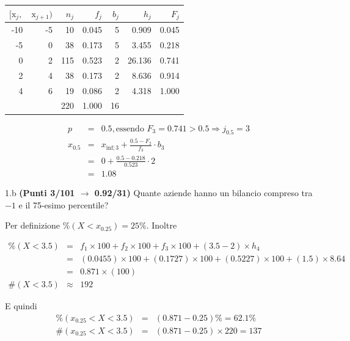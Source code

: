 \documentclass[
  11pt,
]{book}
\theoremstyle{mytheoremstyle}
\theoremstyle{mydefstyle}
\newenvironment{sol}
  {
  \begin{tcolorbox}[enhanced,breakable,arc=0.1mm,boxrule=1pt,colback=white,colframe=iblue,
  title=\bf \fontfamily{lmss}\selectfont \hspace{.5 cm} Soluzione,drop fuzzy shadow]

}{
\end{tcolorbox}
  }
\begin{document}
\begin{sol}

\begin{table}[H]
\centering
\begin{tabular}{rrrrrrr}
\toprule
$[\text{x}_j,$ & $\text{x}_{j+1})$ & $n_j$ & $f_j$ & $b_j$ & $h_j$ & $F_j$\\
\midrule
-10 & -5 & 10 & 0.045 & 5 & 0.909 & 0.045\\
-5 & 0 & 38 & 0.173 & 5 & 3.455 & 0.218\\
0 & 2 & 115 & 0.523 & 2 & 26.136 & 0.741\\
2 & 4 & 38 & 0.173 & 2 & 8.636 & 0.914\\
4 & 6 & 19 & 0.086 & 2 & 4.318 & 1.000\\
 &  & 220 & 1.000 & 16 &  & \\
\bottomrule
\end{tabular}
\end{table}

\begin{eqnarray*}
  p &=&  0.5 , \text{essendo }F_{ 3 }= 0.741  > 0.5  \Rightarrow j_{ 0.5 }= 3 \\
  x_{ 0.5 } &=& x_{\text{inf}; 3 } + \frac{ { 0.5 } - F_{ 2 }} {f_{ 3 }} \cdot b_{ 3 } \\
            &=&  0  + \frac {{ 0.5 } -  0.218 } { 0.523 } \cdot  2  \\
            &=&  1.08 
\end{eqnarray*}

\end{sol}

1.b \textbf{(Punti 3/101 \(\rightarrow\) 0.92/31)} Quante aziende hanno un bilancio compreso tra \(-1\) e il 75-esimo
percentile?

\begin{sol}
Per definizione \(\%(X<x_{ 0.25 })= 25 \%\). Inoltre

\begin{eqnarray*}
   \%(X< 3.5 ) &=&  f_{ 1 }\times 100+f_{ 2 }\times 100+f_{ 3 }\times 100 +( 3.5 - 2 )\times h_{ 4 } \\
                &=&  ( 0.0455 )\times 100+( 0.1727 )\times 100+( 0.5227 )\times 100 +( 1.5 )\times  8.64  \\
                &=&  0.871 \times(100) \\
\#(X< 3.5 )    &\approx& 192 
\end{eqnarray*}

E quindi
\begin{eqnarray*}
   \%( x_{0.25} < X < 3.5 ) &=& ( 0.871 - 0.25 )\%= 62.1 \% \\
   \#( x_{0.25} < X < 3.5 ) &=& ( 0.871 - 0.25 )\times  220 = 137  \\
\end{eqnarray*}

\end{sol}
\end{document}
